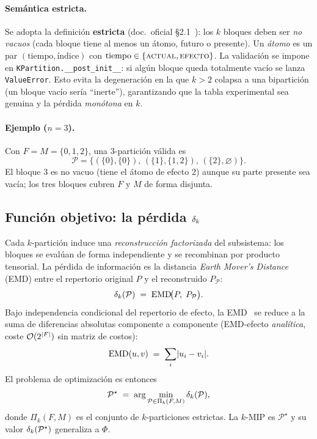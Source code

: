 \documentclass[11pt,letterpaper]{article}
\begin{document}
\paragraph{Semántica estricta.}
Se adopta la definición \textbf{estricta} (doc.\ oficial §2.1~\cite{docproj}): los $k$ bloques
deben ser \emph{no vacuos} (cada bloque tiene al menos un átomo, futuro o
presente). Un \emph{átomo} es un par $(\text{tiempo},\text{índice})$ con
$\text{tiempo}\in\{\textsc{actual},\textsc{efecto}\}$. La validación se impone en
\texttt{KPartition.\_\_post\_init\_\_}: si algún bloque queda totalmente vacío se
lanza \texttt{ValueError}. Esto evita la degeneración en la que $k>2$ colapsa a
una bipartición (un bloque vacío sería ``inerte''), garantizando que la tabla
experimental sea genuina y la pérdida \emph{monótona} en $k$.

\paragraph{Ejemplo ($n=3$).} Con $F=M=\{0,1,2\}$, una $3$-partición válida es
\[
	\mathcal{P}=\{(\{0\},\{0\}),\,(\{1\},\{1,2\}),\,(\{2\},\varnothing)\}.
\]
El bloque $3$ es no vacuo (tiene el átomo de efecto $2$) aunque su parte presente
sea vacía; los tres bloques cubren $F$ y $M$ de forma disjunta.

\subsection{Función objetivo: la pérdida $\delta_k$}
Cada $k$-partición induce una \emph{reconstrucción factorizada} del subsistema:
los bloques se evalúan de forma independiente y se recombinan por producto
tensorial. La pérdida de información es la distancia \emph{Earth Mover's Distance}
(EMD) entre el repertorio original $P$ y el reconstruido $P_{\mathcal{P}}$:
\begin{equation}
	\delta_k(\mathcal{P}) \;=\; \mathrm{EMD}\!\big(P,\; P_{\mathcal{P}}\big).
	\label{eq:deltak}
\end{equation}
Bajo independencia condicional del repertorio de efecto, la EMD~\cite{rubner} se
reduce a la suma de diferencias absolutas componente a componente (EMD-efecto
\emph{analítica}, coste $\mathcal{O}(2^{|F|})$ sin matriz de costos):
\begin{equation}
	\mathrm{EMD}(u,v) \;=\; \sum_i \lvert u_i - v_i\rvert .
	\label{eq:emd}
\end{equation}
El problema de optimización es entonces
\begin{equation}
	\mathcal{P}^\star \;=\; \arg\min_{\mathcal{P}\in \Pi_k(F,M)} \delta_k(\mathcal{P}),
	\label{eq:opt}
\end{equation}
donde $\Pi_k(F,M)$ es el conjunto de $k$-particiones estrictas. La $k$-MIP es
$\mathcal{P}^\star$ y su valor $\delta_k(\mathcal{P}^\star)$ generaliza a $\Phi$.
\end{document}
